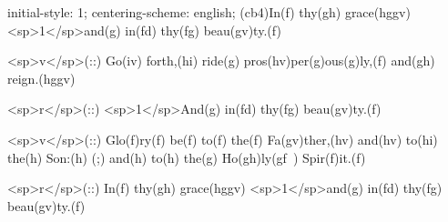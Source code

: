 initial-style: 1;
centering-scheme: english;
(cb4)In(f) thy(gh) grace(hggv) <sp>1</sp>and(g) in(fd) thy(fg) beau(gv)ty.(f) 

<sp>v</sp>(::) Go(iv) forth,(hi) ride(g) pros(hv)per(g)ous(g)ly,(f) and(gh) reign.(hggv)

<sp>r</sp>(::) <sp>1</sp>And(g) in(fd) thy(fg) beau(gv)ty.(f) 

<sp>v</sp>(::) Glo(f)ry(f) be(f) to(f) the(f) Fa(gv)ther,(hv) and(hv) to(hi) the(h) Son:(h) (;) and(h) to(h) the(g) Ho(gh)ly(gf~) Spir(f)it.(f)

<sp>r</sp>(::) In(f) thy(gh) grace(hggv) <sp>1</sp>and(g) in(fd) thy(fg) beau(gv)ty.(f) 